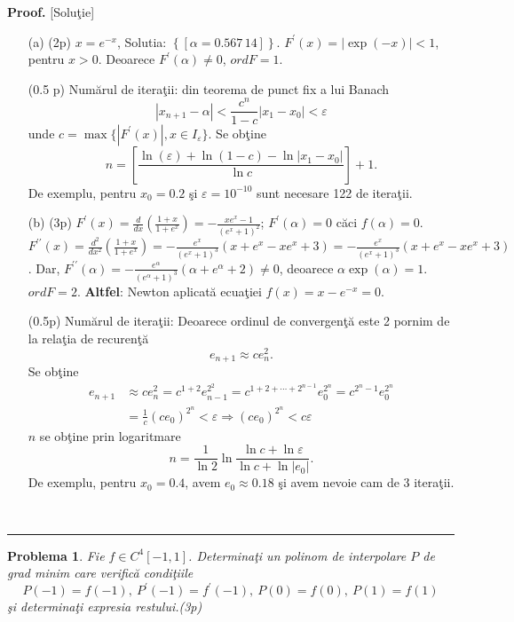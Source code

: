 \documentclass{article}%
\newtheorem{problem}[theorem]{Problema}
\newenvironment{proof}[1][Proof]{\noindent\textbf{#1.} }{\ \rule{0.5em}{0.5em}}
\begin{document}
\begin{proof}
[Solu\c{t}ie]

\begin{enumerate}
\item[(a)] (2p) $x=e^{-x}$, Solutia: $\left\{  \left[  \alpha
=0.567\,14\right]  \right\}  $. $F^{\prime}(x)=\left\vert \exp(-x)\right\vert
<1$, pentru $x>0$. Deoarece $F^{\prime}(\alpha)\neq0$, $ordF=1$. 

(0.5 p)
Num\u{a}rul de itera\c{t}ii: din teorema de punct fix a lui Banach%
\[
\left\vert x_{n+1}-\alpha\right\vert <\frac{c^{n}}{1-c}|x_{1}-x_{0}%
|<\varepsilon
\]
unde $c=\max\{|F^{\prime}(x)|,x\in I_{\varepsilon}\}$. Se ob\c{t}ine
\[
n=\left[  \frac{\ln(\varepsilon)+\ln(1-c)-\ln|x_{1}-x_{0}|}{\ln c}\right]
+1.
\]
De exemplu, pentru $x_{0}=0.2$ \c{s}i $\varepsilon=10^{-10}$ sunt necesare 122
de itera\c{t}ii.

\item[(b)] (3p) $F^{\prime}(x)=\frac{d}{dx}\left(  \frac{1+x}{1+e^{x}}\right)
=\allowbreak-\frac{xe^{x}-1}{\left(  e^{x}+1\right)  ^{2}}$; $F^{\prime
}(\alpha)=0$ c\u{a}ci $f(\alpha)=0$. $F^{\prime\prime}(x)=\frac{d^{2}}{dx^{2}%
}\left(  \frac{1+x}{1+e^{x}}\right)  =\allowbreak-\frac{e^{x}}{\left(
e^{x}+1\right)  ^{3}}\left(  x+e^{x}-xe^{x}+3\right)  =\allowbreak-\frac
{e^{x}}{\left(  e^{x}+1\right)  ^{3}}\left(  x+e^{x}-xe^{x}+3\right)  $. Dar,
$F^{\prime\prime}(\alpha)=-\frac{e^{\alpha}}{\left(  e^{\alpha}+1\right)
^{3}}(\alpha+e^{\alpha}+2)\neq0$, deoarece $\alpha\exp(\alpha)=1$. $ordF=2$.
\textbf{Altfel}: Newton aplicat\u{a} ecua\c{t}iei $f(x)=x-e^{-x}=0$. 

(0.5p)
Num\u{a}rul de itera\c{t}ii: Deoarece ordinul de convergen\c{t}\u{a} este 2
pornim de la rela\c{t}ia de recuren\c{t}\u{a}%
\[
e_{n+1}\approx ce_{n}^{2}.
\]
Se ob\c{t}ine
\begin{align*}
e_{n+1}  &  \approx ce_{n}^{2}=c^{1+2}e_{n-1}^{2^{2}}=c^{1+2+\cdots+2^{n-1}%
}e_{0}^{2^{n}}=c^{2^{n}-1}e_{0}^{2^{n}}\\
&  =\frac{1}{c}\left(  ce_{0}\right)  ^{2^{n}}<\varepsilon\Longrightarrow
\left(  ce_{0}\right)  ^{2^{n}}<c\varepsilon
\end{align*}
$n$ se ob\c{t}ine prin logaritmare%
\[
n=\frac{1}{\ln2}\ln\frac{\ln c+\ln\varepsilon}{\ln c+\ln\left\vert
e_{0}\right\vert }.
\]
De exemplu, pentru $x_{0}=0.4$, avem $e_{0}\approx0.18$ \c{s}i avem nevoie cam
de 3 itera\c{t}ii.
\end{enumerate}
\end{proof}

\begin{problem}
Fie $f\in C^{4}[-1,1]$. Determina\c{t}i un polinom de interpolare $P$ de grad
minim care verific\u{a} condi\c{t}iile
\[
P(-1)=f(-1),~P^{\prime}(-1)=f^{\prime}(-1),~P(0)=f(0),~P(1)=f(1)
\]
\c{s}i determina\c{t}i expresia restului.(3p)
\end{problem}
\end{document}
